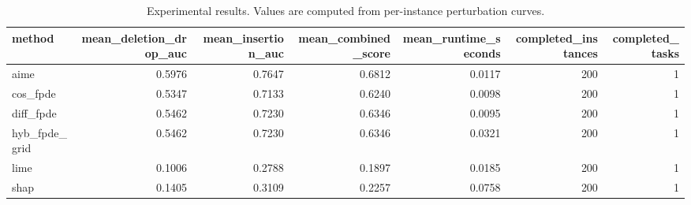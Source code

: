 \begin{table}[t]
\caption{Experimental results. Values are computed from per-instance perturbation curves.}
\label{tab:main_results_computed}
\centering
\begin{tabular}{lrrrrrr}
\toprule
method & mean\_deletion\_drop\_auc & mean\_insertion\_auc & mean\_combined\_score & mean\_runtime\_seconds & completed\_instances & completed\_tasks \\
\midrule
aime & 0.5976 & 0.7647 & 0.6812 & 0.0117 & 200 & 1 \\
cos\_fpde & 0.5347 & 0.7133 & 0.6240 & 0.0098 & 200 & 1 \\
diff\_fpde & 0.5462 & 0.7230 & 0.6346 & 0.0095 & 200 & 1 \\
hyb\_fpde\_grid & 0.5462 & 0.7230 & 0.6346 & 0.0321 & 200 & 1 \\
lime & 0.1006 & 0.2788 & 0.1897 & 0.0185 & 200 & 1 \\
shap & 0.1405 & 0.3109 & 0.2257 & 0.0758 & 200 & 1 \\
\bottomrule
\end{tabular}

\end{table}
